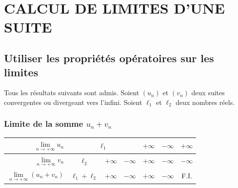\documentclass[11pt,twoside, openany]{extbook}
\begin{document}
\section{CALCUL DE LIMITES D'UNE SUITE}
\subsection{Utiliser les propriétés opératoires sur les limites}

\noindent Tous les résultats suivants sont admis.  Soient $(u_n)$ et $(v_n)$ deux suites convergentes ou divergeant vers l'infini. Soient $\ell_1$ et $\ell_2$ deux nombres réels. 
\subsubsection{Limite de la somme $u_n+v_n$}
\begin{center}
{\renewcommand{\arraystretch}{1.2} %
{\setlength{\tabcolsep}{0.6cm} %
\begin{tabular}{|r|*5{c|}>{\columncolor[RGB]{211, 211, 211}}c|}
\hline
$\lim\limits_{n \rightarrow +\infty}  u_n$ & \multicolumn{3}{c|}{$\ell_1$} & $+\infty$ & $-\infty$ & $+\infty$\\
\hline
$\lim\limits_{n \rightarrow +\infty}  v_n$ & $\ell_2$ & $+\infty$ & $-\infty$ & $+\infty$ & $-\infty$ & $-\infty$\\
\hline
\hline
$\lim\limits_{n \rightarrow +\infty}  (u_n+v_n)$ & $\ell_1+\ell_2$ & $+\infty$ & $-\infty$ & $+\infty$ & $-\infty$ & F.I.\\
\hline
\end{tabular}}}
\end{center}
\end{document}
